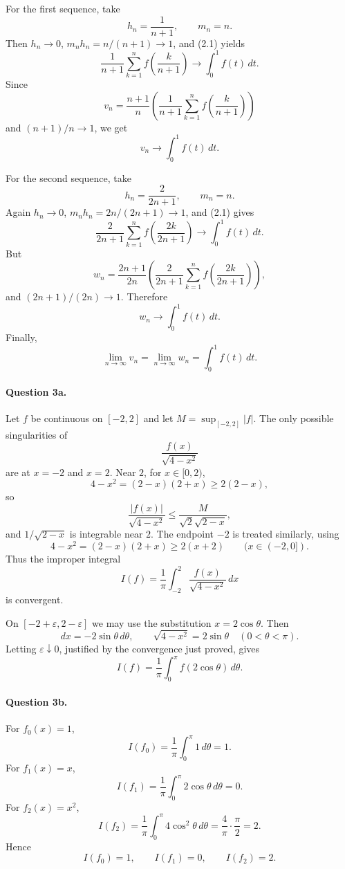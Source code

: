 \documentclass[11pt,a4paper]{article}
\begin{document}
For the first sequence, take
\[
  h_n=\frac1{n+1},\qquad m_n=n.
\]
Then $h_n\to0$, $m_nh_n=n/(n+1)\to1$, and (2.1) yields
\[
  \frac1{n+1}\sum_{k=1}^n f\left(\frac{k}{n+1}\right)
  \longrightarrow
  \int_0^1 f(t)\,dt.
\]
Since
\[
  v_n
  =
  \frac{n+1}{n}
  \left(
    \frac1{n+1}\sum_{k=1}^n f\left(\frac{k}{n+1}\right)
  \right)
\]
and $(n+1)/n\to1$, we get
\[
  v_n\longrightarrow\int_0^1 f(t)\,dt.
\]

For the second sequence, take
\[
  h_n=\frac2{2n+1},\qquad m_n=n.
\]
Again $h_n\to0$, $m_nh_n=2n/(2n+1)\to1$, and (2.1) gives
\[
  \frac2{2n+1}
  \sum_{k=1}^n
  f\left(\frac{2k}{2n+1}\right)
  \longrightarrow
  \int_0^1 f(t)\,dt.
\]
But
\[
  w_n
  =
  \frac{2n+1}{2n}
  \left(
    \frac2{2n+1}
    \sum_{k=1}^n
    f\left(\frac{2k}{2n+1}\right)
  \right),
\]
and $(2n+1)/(2n)\to1$.  Therefore
\[
  w_n\longrightarrow\int_0^1 f(t)\,dt.
\]
Finally,
\[
  \boxed{\lim_{n\to\infty}v_n=\lim_{n\to\infty}w_n=\int_0^1 f(t)\,dt.}
\]

\paragraph{Question 3a.}
Let $f$ be continuous on $[-2,2]$ and let $M=\sup_{[-2,2]}|f|$.
The only possible singularities of
\[
  \frac{f(x)}{\sqrt{4-x^2}}
\]
are at $x=-2$ and $x=2$.  Near $2$, for $x\in[0,2)$,
\[
  4-x^2=(2-x)(2+x)\ge 2(2-x),
\]
so
\[
  \frac{|f(x)|}{\sqrt{4-x^2}}\le \frac{M}{\sqrt{2}\sqrt{2-x}},
\]
and $1/\sqrt{2-x}$ is integrable near $2$.  The endpoint $-2$ is treated similarly, using
\[
  4-x^2=(2-x)(2+x)\ge 2(x+2)\qquad(x\in(-2,0]).
\]
Thus the improper integral
\[
  I(f)=\frac1\pi\int_{-2}^2\frac{f(x)}{\sqrt{4-x^2}}\,dx
\]
is convergent.

On $[-2+\varepsilon,2-\varepsilon]$ we may use the substitution $x=2\cos\theta$.  Then
\[
  dx=-2\sin\theta\,d\theta,
  \qquad
  \sqrt{4-x^2}=2\sin\theta\quad(0<\theta<\pi).
\]
Letting $\varepsilon\downarrow0$, justified by the convergence just proved, gives
\[
  \boxed{I(f)=\frac1\pi\int_0^\pi f(2\cos\theta)\,d\theta.}
\]

\paragraph{Question 3b.}
For $f_0(x)=1$,
\[
  I(f_0)=\frac1\pi\int_0^\pi1\,d\theta=1.
\]
For $f_1(x)=x$,
\[
  I(f_1)=\frac1\pi\int_0^\pi2\cos\theta\,d\theta=0.
\]
For $f_2(x)=x^2$,
\[
  I(f_2)=\frac1\pi\int_0^\pi4\cos^2\theta\,d\theta
        =\frac4\pi\cdot\frac\pi2=2.
\]
Hence
\[
  \boxed{I(f_0)=1,\qquad I(f_1)=0,\qquad I(f_2)=2.}
\]
\end{document}
